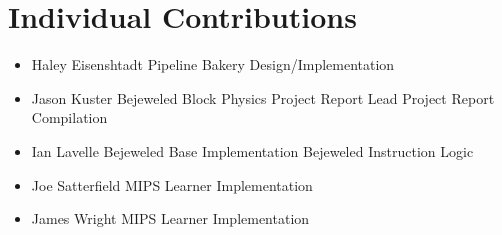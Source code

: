 \documentclass[12pt]{article}
\begin{document}
	\section{Individual Contributions}
	\begin{itemize}
		\item Haley Eisenshtadt
		\subitem Pipeline Bakery Design/Implementation
		\item Jason Kuster
		\subitem Bejeweled Block Physics
		\subitem Project Report Lead
		\subitem Project Report Compilation
		\item Ian Lavelle
		\subitem Bejeweled Base Implementation
		\subitem Bejeweled Instruction Logic
		\item Joe Satterfield
		\subitem MIPS Learner Implementation
		\item James Wright
		\subitem MIPS Learner Implementation
	\end{itemize}
\end{document}
